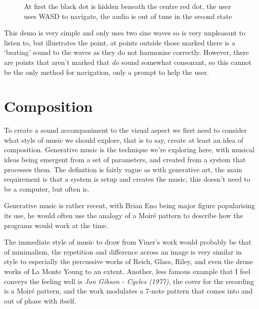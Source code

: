 \begin{figure}[H]
\centering
{}%
\hspace*{2cm}%
\caption{At first the black dot is hidden beneath the centre red dot, the user uses WASD to navigate,
the audio is out of tune in the second state}
\end{figure}

This demo is very simple and only uses two sine waves so is very unpleasant to
listen to, but illustrates the point, at points outside those marked there is a
`beating' sound to the waves as they do not harmonise correctly. However, there
are points that aren't marked that \emph{do} sound somewhat consonant, so this
cannot be the only method for navigation, only a prompt to help the user.
\section{Composition}
\label{Composition}
To create a sound accompaniment to the visual aspect we first need to consider
what style of music we should explore, that is to say, create at least an idea
of composition. Generative music is the technique we're exploring here, with
musical ideas being emergent from a set of parameters, and created from a system
that processes them. The definition is fairly vague as with generative art, the
main requirement is that a system is setup and creates the music, this doesn't
need to be a computer, but often is.

Generative music is rather recent, with Brian Eno being major figure
popularising its use, he would often use the analogy of a Moir\'{e} pattern to
describe how the programs would work at the time.  

The immediate style of music to draw from Viner's work would probably be that of
minimalism, the repetition and difference across an image is very similar in
style to especially the percussive works of Reich, Glass, Riley, and even the
drone works of La Monte Young to an extent. Another, less famous example that I
feel conveys the feeling well is \emph{Jon Gibson - Cycles (1977)}, the cover
for the recording is a Moir\'{e} pattern, and the work modulates a 7-note
pattern that comes into and out of phase with itself. 

